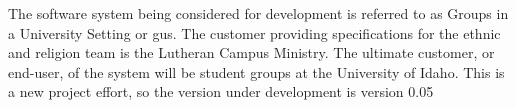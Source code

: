 The software system being considered for development is referred
		to as Groups in a University Setting or gus. The customer providing
		specifications for the ethnic and religion team is the Lutheran
		Campus Ministry. The ultimate customer, or end-user, of the system
		will be student groups at the University of Idaho. This is a new
		project effort, so the version under development is version 0.05